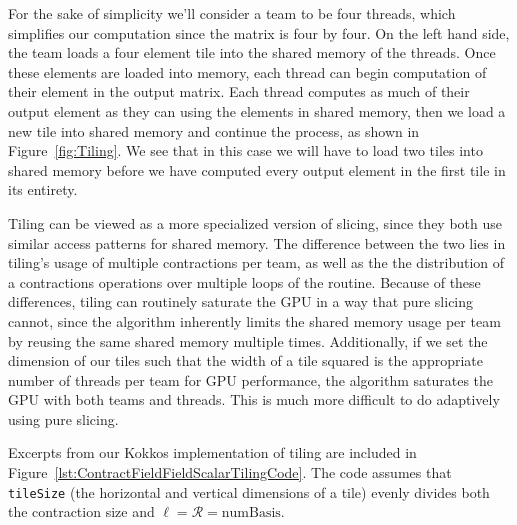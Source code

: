 For the sake of simplicity we'll consider a team to be four threads, which
simplifies our computation since the matrix is four by four. On the left hand
side, the team loads a four element tile into the shared memory of the
threads. Once these elements are loaded into memory, each thread can begin
computation of their element in the output matrix. Each thread computes as much
of their output element as they can using the elements in shared memory, then
we load a new tile into shared memory and continue the process, as shown in Figure~\ref{fig:Tiling}.
We see that in this case we will have to load two tiles into shared memory
before we have computed every output element in the first tile in its entirety. 


    Tiling can be viewed as a more specialized version of slicing, since they
both use similar access patterns for shared memory. The difference between the
two lies in tiling's usage of multiple contractions per team, as well as the
the distribution of a contractions operations over multiple loops of the
routine. Because of these differences, tiling can routinely saturate the GPU in
a way that pure slicing cannot, since the algorithm inherently limits the
shared memory usage per team by reusing the same shared memory multiple times.
Additionally, if we set the dimension of our tiles such that the width of a tile
squared is the appropriate number of threads per team for GPU performance, the algorithm
saturates the GPU with both teams and threads. This is much more difficult to do 
adaptively using pure slicing. 
	
    Excerpts from our Kokkos implementation of tiling are included in Figure~\ref{lst:ContractFieldFieldScalarTilingCode}. The
code assumes that \texttt{tileSize} (the horizontal and vertical dimensions of a tile)
evenly divides both the contraction size and $\ell = \mathcal{R} =
\text{numBasis}$.
	
